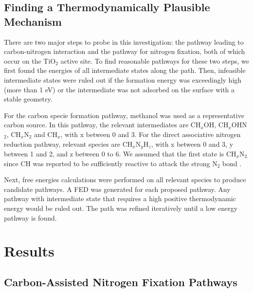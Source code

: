 \subsection{Finding a Thermodynamically Plausible Mechanism }
There are two major steps to probe in this investigation: the pathway leading to carbon-nitrogen interaction and the pathway for nitrogen fixation, both of which occur on the TiO$_2$ active site. To find reasonable pathways for these two steps, we first found the energies of all intermediate states along the path. Then, infeasible intermediate states were ruled out if the formation energy was exceedingly high (more than 1 eV) or the intermediate was not adsorbed on the surface with a stable geometry. 

For the carbon specie formation pathway, methanol was used as a representative carbon source. In this pathway, the relevant intermediates are CH$_x$OH, CH$_x$OHN$_2$, CH$_x$N$_2$ and CH$_x$, with x between 0 and 3. For the direct associative nitrogen reduction pathway, relevant species are CH$_x$N$_y$H$_z$, with x  between 0 and 3, y between 1 and 2, and z between 0 to 6. We assumed that the first state is CH$_x$N$_2$ since CH was reported to be sufficiently reactive to attack the strong N$_2$ bond \cite{Glarborg_2018}.

Next, free energies calculations were performed on all relevant species to produce candidate pathways. A FED was generated for each proposed pathway. Any pathway with intermediate state that requires a high positive thermodynamic energy would be ruled out. The path was refined iteratively until a low energy pathway is found.

\section{Results}

\subsection{Carbon-Assisted Nitrogen Fixation Pathways}

